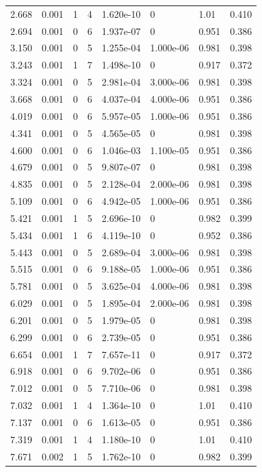 \documentclass[preview]{standalone}
\begin{document}
{{\begin{tabular}{L{1.2cm}C{1.2cm} C{0.3cm}C{0.5cm} C{1.4cm}C{1.4cm} C{1.4cm}C{1.4cm}}
  2.668  &  0.001  & 1     &  4 &  1.620e-10  & 0  & 1.01 &  0.410   \\ 
  2.694  &  0.001  & 0     &  6 &  1.937e-07  & 0  & 0.951 &  0.386   \\ 
  3.150  &  0.001  & 0     &  5 &  1.255e-04  & 1.000e-06  & 0.981 &  0.398   \\ 
  3.243  &  0.001  & 1     &  7 &  1.498e-10  & 0  & 0.917 &  0.372   \\ 
  3.324  &  0.001  & 0     &  5 &  2.981e-04  & 3.000e-06  & 0.981 &  0.398   \\ 
  3.668  &  0.001  & 0     &  6 &  4.037e-04  & 4.000e-06  & 0.951 &  0.386   \\ 
  4.019  &  0.001  & 0     &  6 &  5.957e-05  & 1.000e-06  & 0.951 &  0.386   \\ 
  4.341  &  0.001  & 0     &  5 &  4.565e-05  & 0  & 0.981 &  0.398   \\ 
  4.600  &  0.001  & 0     &  6 &  1.046e-03  & 1.100e-05  & 0.951 &  0.386   \\ 
  4.679  &  0.001  & 0     &  5 &  9.807e-07  & 0  & 0.981 &  0.398   \\ 
  4.835  &  0.001  & 0     &  5 &  2.128e-04  & 2.000e-06  & 0.981 &  0.398   \\ 
  5.109  &  0.001  & 0     &  6 &  4.942e-05  & 1.000e-06  & 0.951 &  0.386   \\ 
  5.421  &  0.001  & 1     &  5 &  2.696e-10  & 0  & 0.982 &  0.399   \\ 
  5.434  &  0.001  & 1     &  6 &  4.119e-10  & 0  & 0.952 &  0.386   \\ 
  5.443  &  0.001  & 0     &  5 &  2.689e-04  & 3.000e-06  & 0.981 &  0.398   \\ 
  5.515  &  0.001  & 0     &  6 &  9.188e-05  & 1.000e-06  & 0.951 &  0.386   \\ 
  5.781  &  0.001  & 0     &  5 &  3.625e-04  & 4.000e-06  & 0.981 &  0.398   \\ 
  6.029  &  0.001  & 0     &  5 &  1.895e-04  & 2.000e-06  & 0.981 &  0.398   \\ 
  6.201  &  0.001  & 0     &  5 &  1.979e-05  & 0  & 0.981 &  0.398   \\ 
  6.299  &  0.001  & 0     &  6 &  2.739e-05  & 0  & 0.951 &  0.386   \\ 
  6.654  &  0.001  & 1     &  7 &  7.657e-11  & 0  & 0.917 &  0.372   \\ 
  6.918  &  0.001  & 0     &  6 &  9.702e-06  & 0  & 0.951 &  0.386   \\ 
  7.012  &  0.001  & 0     &  5 &  7.710e-06  & 0  & 0.981 &  0.398   \\ 
  7.032  &  0.001  & 1     &  4 &  1.364e-10  & 0  & 1.01 &  0.410   \\ 
  7.137  &  0.001  & 0     &  6 &  1.613e-05  & 0  & 0.951 &  0.386   \\ 
  7.319  &  0.001  & 1     &  4 &  1.180e-10  & 0  & 1.01 &  0.410   \\ 
  7.671  &  0.002  & 1     &  5 &  1.762e-10  & 0  & 0.982 &  0.399   \\ 
\hline 
\end{tabular} 

}}
\end{document}
